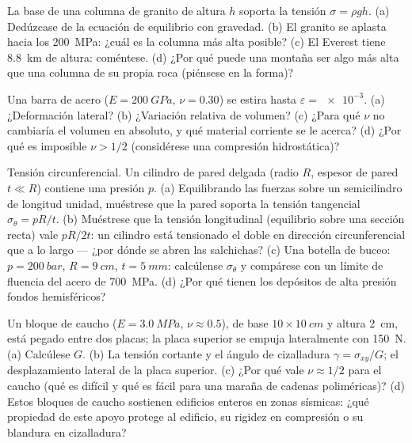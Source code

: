 \begin{exercise}[$\star$]\label{exo:b3:continuum-elasticity:3}
La base de una columna de granito de altura $h$ soporta la tensión $\sigma
= \rho gh$. (a) Dedúzcase de la ecuación de equilibrio con gravedad.
(b) El granito se aplasta hacia los \qty{200}{MPa}: ¿cuál es la columna más
alta posible? (c) El Everest tiene \qty{8.8}{km} de altura: coméntese. (d) ¿Por
qué puede una montaña ser algo más alta que una columna de su propia roca
(piénsese en la forma)?
\end{exercise}

\begin{exercise}[$\star$]\label{exo:b3:continuum-elasticity:4}
Una barra de acero ($E = \qty{200}{GPa}$, $\nu = 0.30$) se estira hasta
$\varepsilon = \num{e-3}$. (a) ¿Deformación lateral? (b) ¿Variación
relativa de volumen? (c) ¿Para qué $\nu$ no cambiaría el volumen en
absoluto, y qué material corriente se le acerca? (d) ¿Por qué es imposible
$\nu > 1/2$ (considérese una compresión hidrostática)?
\end{exercise}

\begin{exercise}[$\star\star$]\label{exo:b3:continuum-elasticity:5}
Tensión circunferencial. Un cilindro de pared delgada (radio $R$, espesor
de pared $t \ll
R$) contiene una presión $p$. (a) Equilibrando las fuerzas sobre un
semicilindro de longitud unidad, muéstrese que la pared soporta la tensión
tangencial $\sigma_\theta = pR/t$. (b) Muéstrese que la tensión longitudinal
(equilibrio sobre una sección recta) vale $pR/2t$: un cilindro está
tensionado el doble en dirección circunferencial que a lo largo --- ¿por
dónde se abren las salchichas? (c) Una botella de buceo: $p =
\qty{200}{bar}$, $R = \qty{9}{cm}$, $t = \qty{5}{mm}$: calcúlense
$\sigma_\theta$ y compárese con un límite de fluencia del acero de
\qty{700}{MPa}. (d) ¿Por qué tienen los depósitos de alta presión fondos
hemisféricos?
\end{exercise}

\begin{exercise}[$\star\star$]\label{exo:b3:continuum-elasticity:6}
Un bloque de caucho ($E = \qty{3.0}{MPa}$, $\nu \approx 0.5$), de base $10
\times \qty{10}{cm}$ y altura \qty{2}{cm}, está pegado entre dos placas;
la placa superior se empuja lateralmente con \qty{150}{N}. (a) Calcúlese $G$.
(b) La tensión cortante y el ángulo de cizalladura $\gamma = \sigma_{xy}/G$;
el desplazamiento lateral de la placa superior. (c) ¿Por qué vale
$\nu \approx 1/2$ para el caucho (qué es difícil y qué es fácil para una
maraña de cadenas poliméricas)? (d) Estos bloques de caucho sostienen
edificios enteros en zonas sísmicas: ¿qué propiedad de este apoyo protege al
edificio, su rigidez en compresión o su blandura en cizalladura?
\end{exercise}

